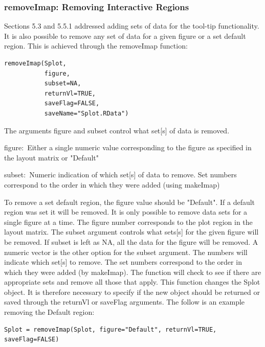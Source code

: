 \documentclass[]{article}
\begin{document}
\subsubsection{removeImap: Removing Interactive Regions}

\indent Sections 5.3 and 5.5.1 addressed adding sets of data for the tool-tip functionality. It is also possible to remove any set of data for a given figure or a set default region. This is achieved through the removeImap function:

\begin{verbatim}
removeImap(Splot,
           figure,
           subset=NA,
           returnVl=TRUE,
           saveFlag=FALSE,
           saveName="Splot.RData")
\end{verbatim}

\indent The arguments figure and subset control what set[s] of data is removed. 

\begin{description}
\item{figure:~}{Either a single numeric value corresponding to the figure as specified in the layout matrix or "Default"}
\item{subset:~}{Numeric indication of which set[s] of data to remove. Set numbers correspond to the order in which they were added (using makeImap)}
\end{description}

\indent To remove a set default region, the figure value should be "Default". If a default region was set it will be removed. It is only possible to remove data sets for a single figure at a time. The figure number corresponds to the plot region in the layout matrix. The subset argument controls what sets[s] for the given figure will be removed. If subset is left as NA, all the data for the figure will be removed. A numeric vector is the other option for the subset argument. The numbers will indicate which set[s] to remove. The set numbers correspond to the order in which they were added (by makeImap). The function will check to see if there are appropriate sets and remove all those that apply. \newline
\indent This function changes the Splot object. It is therefore necessary to specify if the new object should be returned or saved through the returnVl or saveFlag arguments. \newline
\indent The follow is an example removing the Default region:


\begin{verbatim}
Splot = removeImap(Splot, figure="Default", returnVl=TRUE, saveFlag=FALSE)
\end{verbatim}
\end{document}
